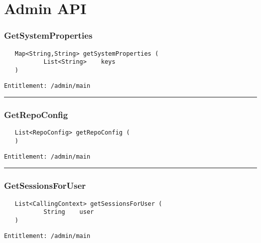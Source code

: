 \chapter{Admin API}

\subsection{GetSystemProperties}
\label{Api:GetSystemProperties}
\begin{Verbatim}
   Map<String,String> getSystemProperties (
           List<String>    keys
   )
\end{Verbatim}
\begin{Verbatim}[formatcom=\color{Maroon}]
  Entitlement: /admin/main
\end{Verbatim}



\rule{12cm}{2pt}
\subsection{GetRepoConfig}
\label{Api:GetRepoConfig}
\begin{Verbatim}
   List<RepoConfig> getRepoConfig (
   )
\end{Verbatim}
\begin{Verbatim}[formatcom=\color{Maroon}]
  Entitlement: /admin/main
\end{Verbatim}



\rule{12cm}{2pt}
\subsection{GetSessionsForUser}
\label{Api:GetSessionsForUser}
\begin{Verbatim}
   List<CallingContext> getSessionsForUser (
           String    user
   )
\end{Verbatim}
\begin{Verbatim}[formatcom=\color{Maroon}]
  Entitlement: /admin/main
\end{Verbatim}



